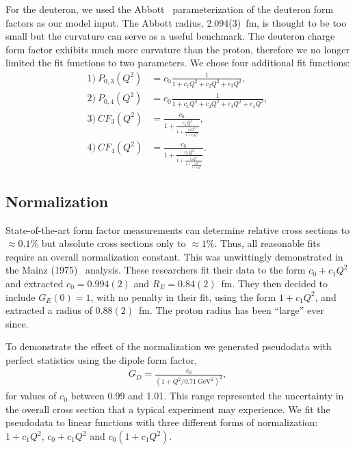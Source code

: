 \documentclass[aps,prd,twocolumn,groupedaddress,10pt]{revtex4-1}
\begin{document}
For the deuteron, we used the Abbott~\cite{Abbott:2000ak} parameterization of the deuteron form factors as our model input. The Abbott radius, 2.094(3)~fm, is thought to be too small but the curvature can serve  as a useful benchmark. The deuteron charge form factor exhibits much more curvature than the proton, therefore we no longer limited the fit functions to two parameters. We chose four additional fit functions:
\begin{align}
1)~P_{0,3}(Q^2) &= c_0 \frac{1}{1+c_1 Q^2+c_2 Q^2+c_3 Q^2},\\
2)~P_{0,4}(Q^2) &= c_0 \frac{1}{1+c_1 Q^2+c_2 Q^2+c_3 Q^2 + c_4 Q^2},\\
3)~{CF}_3(Q^2)&=\frac{c_0}{1+\frac{c_1 Q^2}{1+\frac{c_2 Q^2}{1+c_3 Q^2}}},\\
4)~{CF}_4(Q^2)&=\frac{c_0}{1+\frac{c_1 Q^2}{1+\frac{c_2 Q^2}{1+\frac{c_3 Q^2}{1+c_4 Q^2}}}}.
\end{align}

\subsection{Normalization}
\label{Normalization}

State-of-the-art form factor measurements can determine relative cross sections to $\approx 0.1\%$ but absolute cross sections only to $\approx 1\%$. Thus, all reasonable fits require an overall normalization constant. This was unwittingly demonstrated in the Mainz (1975)~\cite{Mainz1975} analysis. These researchers fit their data to the form $c_0 + c_1 Q^2$ and extracted $c_0 = 0.994(2)$ and $R_E = 0.84(2)$~fm. They then decided to include $G_E(0)=1$, with no penalty in their fit, using the form $1 + c_1 Q^2$, and extracted a radius of $0.88(2)$~fm. The proton radius has been ``large'' ever since. 

To demonstrate the effect of the normalization we generated pseudodata with perfect statistics using the dipole form factor,
\begin{align}
G_D = \frac{c_0}{\left(1+Q^2/0.71~\text{GeV}^2\right)^2},
\end{align}
for values of $c_0$ between 0.99 and 1.01. This range represented the uncertainty in the overall cross section that a typical experiment may experience. We fit the pseudodata to linear functions with three different forms of normalization: $1+c_1 Q^2$, $c_0 + c_1 Q^2$ and $c_0 (1+c_1 Q^2)$. 
\end{document}
